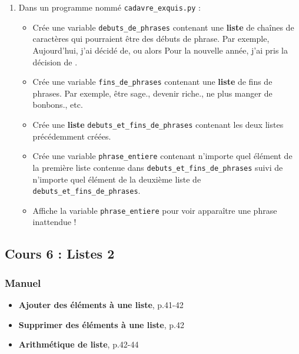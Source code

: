 \documentclass[11pt]{article}
\begin{document}
\begin{enumerate}
\item Dans un programme nommé \texttt{cadavre\_exquis.py} :
\begin{itemize}
\item Crée une variable \texttt{debuts\_de\_phrases} contenant une \textbf{liste} de chaînes de caractères qui pourraient être des débuts de phrase. Par exemple, \og Aujourd'hui, j'ai décidé de\fg{}, ou alors \og Pour la nouvelle année, j'ai pris la décision de \fg{}.
\item Crée une variable \texttt{fins\_de\_phrases} contenant une \textbf{liste} de fins de phrases. Par exemple, \og être sage.\fg{}, \og devenir riche.\fg{}, \og ne plus manger de bonbons.\fg{}, etc.
\item Crée une \textbf{liste} \texttt{debuts\_et\_fins\_de\_phrases} contenant les deux listes précédemment créées.
\item Crée une variable \texttt{phrase\_entiere} contenant n'importe quel élément de la première liste contenue dans \texttt{debuts\_et\_fins\_de\_phrases} suivi de n'importe quel élément de la deuxième liste de \texttt{debuts\_et\_fins\_de\_phrases}.
\item Affiche la variable \texttt{phrase\_entiere} pour voir apparaître une phrase inattendue !
\end{itemize}
\end{enumerate}

\subsection*{Cours 6 : Listes 2}
\label{chapitre2_cours6}
\subsubsection*{Manuel}
\label{sec:org0dcb82d}
\begin{itemize}
\item \textbf{\og Ajouter des éléments à une liste\fg{}}, p.41-42
\item \textbf{\og Supprimer des éléments à une liste\fg{}}, p.42
\item \textbf{\og Arithmétique de liste\fg{}}, p.42-44
\end{itemize}
\end{document}
